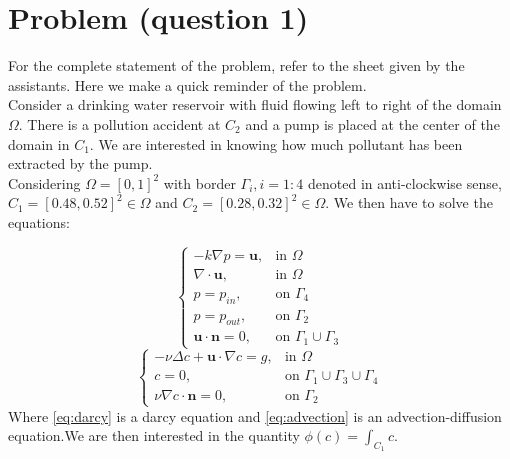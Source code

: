 \documentclass[conference]{IEEEtran}
\begin{document}
\section{Problem (question 1)}
For the complete statement of the problem, refer to the sheet given by the assistants. Here we make a quick reminder of the problem.\\
Consider a drinking water reservoir with fluid flowing left to right of the domain $\Omega$. There is a pollution accident at $C_2$ and a pump is placed at the center of the domain in $C_1$. We are interested in knowing how much pollutant has been extracted by the pump. \\
Considering $\Omega = [0,1]^2$ with border $\Gamma_i , i=1:4$ denoted in anti-clockwise sense, $C_1 = [0.48,0.52]^2 \in \Omega$ and $C_2=[0.28,0.32]^2 \in \Omega$. We then have to solve the equations:

\begin{equation}
    \begin{cases}
      -k \nabla p = \textbf{u} , & \text{in $\Omega$}  \\
      \nabla \cdot \textbf{u}, & \text{in $\Omega$} \\
      p=p_{in} , & \text{on $\Gamma_4$} \\
      p=p_{out} , & \text{on $\Gamma_2$} \\
      \textbf{u} \cdot \textbf{n} = 0, & \text{on } \Gamma_1 \cup \Gamma_3
    \end{cases}
    \label{eq:darcy}
\end{equation}
\begin{equation}
    \begin{cases}
      -\nu \Delta c + \textbf{u} \cdot \nabla c = g ,& \text{in $\Omega$}  \\
      c = 0, & \text{on } \Gamma_1 \cup \Gamma_3 \cup \Gamma_4 \\
      \nu \nabla c \cdot \textbf{n} = 0, & \text{on } \Gamma_2
    \end{cases}
    \label{eq:advection}
\end{equation}
Where \ref{eq:darcy} is a darcy equation and \ref{eq:advection} is an advection-diffusion equation.We are then interested in the quantity $\phi(c) = \int_{C_1} c$.

\end{document}
